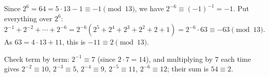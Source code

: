 Since $2^6=64=5\cdot13-1\equiv-1\pmod{13}$, we have $2^{-6}\equiv(-1)^{-1}=-1$. Put everything over $2^6$:
\[
2^{-1}+2^{-2}+\cdots+2^{-6}=2^{-6}\left(2^5+2^4+2^3+2^2+2+1\right)=2^{-6}\cdot63\equiv-63\pmod{13}.
\]
As $63=4\cdot13+11$, this is $-11\equiv\boxed{2}\pmod{13}$.

Check term by term: $2^{-1}\equiv7$ (since $2\cdot7=14$), and multiplying by $7$ each time gives $2^{-2}\equiv10$, $2^{-3}\equiv5$, $2^{-4}\equiv9$, $2^{-5}\equiv11$, $2^{-6}\equiv12$; their sum is $54\equiv2$.
